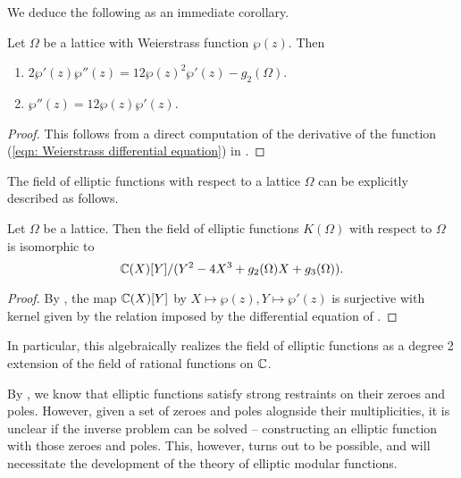 We deduce the following as an immediate corollary. 
\begin{corollary}
    Let $\Omega$ be a lattice with Weierstrass function $\wp(z)$. Then 
    \begin{enumerate}[label=(\roman*)]
        \item $2\wp'(z)\wp''(z)=12\wp(z)^{2}\wp'(z)- g_{2}(\Omega)$. 
        \item $\wp''(z)=12\wp(z)\wp'(z)$. 
    \end{enumerate}
\end{corollary}
\begin{proof}
    This follows from a direct computation of the derivative of the function (\ref{eqn: Weierstrass differential equation}) in .
\end{proof}
The field of elliptic functions with respect to a lattice $\Omega$ can be explicitly described as follows. 
\begin{theorem}\label{thm: description of field of elliptic functions}
    Let $\Omega$ be a lattice. Then the field of elliptic functions $K(\Omega)$ with respect to $\Omega$ is isomorphic to 
    $$\mathbb{C}(X)[Y]/(Y^{2}-4X^{3}+g_{2}(\Omega)X+g_{3}(\Omega)).$$
\end{theorem}
\begin{proof}
    By , the map $\mathbb{C}(X)[Y]$ by $X\mapsto\wp(z), Y\mapsto\wp'(z)$ is surjective with kernel given by the relation imposed by the differential equation of . 
\end{proof}
In particular, this algebraically realizes the field of elliptic functions as a degree 2 extension of the field of rational functions on $\mathbb{C}$. 

By , we know that elliptic functions satisfy strong restraints on their zeroes and poles. However, given a set of zeroes and poles alognside their multiplicities, it is unclear if the inverse problem can be solved -- constructing an elliptic function with those zeroes and poles. This, however, turns out to be possible, and will necessitate the development of the theory of elliptic modular functions. 

